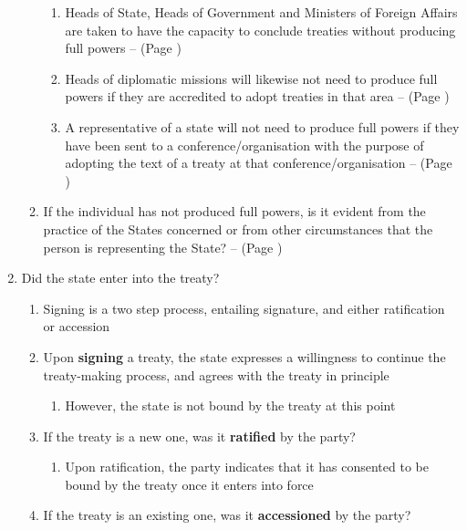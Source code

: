 \begin{enumerate}
\begin{enumerate}
\begin{enumerate}
            \item Heads of State, Heads of Government and Ministers of Foreign Affairs are taken to have the capacity to conclude treaties without producing full powers --  (Page \pageref{VCLT Art 2})
            \item Heads of diplomatic missions will likewise not need to produce full powers if they are accredited to adopt treaties in that area --  (Page \pageref{VCLT Art 2})
            \item A representative of a state will not need to produce full powers if they have been sent to a conference/organisation with the purpose of adopting the text of a treaty at that conference/organisation --  (Page \pageref{VCLT Art 2})
        \end{enumerate}
        \item If the individual has not produced full powers, is it evident from the practice of the States concerned or from other circumstances that the person is representing the State? --  (Page \pageref{VCLT Art 2})
    \end{enumerate}
    \item Did the state enter into the treaty?
    \begin{enumerate}
        \item Signing is a two step process, entailing signature, and either ratification or accession
        \item Upon \textbf{signing} a treaty, the state expresses a willingness to continue the treaty-making process, and agrees with the treaty in principle
        \begin{enumerate}
            \item However, the state is not bound by the treaty at this point
        \end{enumerate}
        \item If the treaty is a new one, was it \textbf{ratified} by the party?
        \begin{enumerate}
            \item Upon ratification, the party indicates that it has consented to be bound by the treaty once it enters into force
        \end{enumerate}
        \item If the treaty is an existing one, was it \textbf{accessioned} by the party?
        \begin{enumerate}

\end{enumerate}
\end{enumerate}
\end{enumerate}

